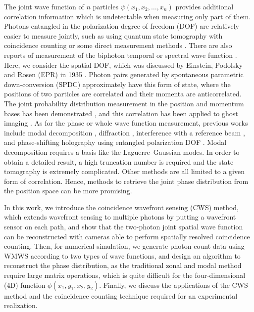 \documentclass[pra,english,reprint,nofootinbib,aps,superscriptaddress,showpacs,showkeys]{revtex4-2}
\theoremstyle{definition}
\theoremstyle{remark}
\begin{document}
	The joint wave function of $n$ particles $\psi(x_1,x_2,\ldots,x_n)$ provides additional correlation information which is undetectable when measuring only part of them. Photons entangled in the polarization degree of freedom (DOF) are relatively easier to measure jointly, such as using quantum state tomography with coincidence counting \cite{tomo,tomo2} or some direct measurement methods \cite{Pan2019,Chen2021}. There are also reports of measurement of the biphoton temporal or spectral wave function \cite{temp1,temp2}. Here, we consider the spatial DOF, which was discussed by Einstein, Podolsky and Rosen (EPR) in 1935 \cite{EPR}. Photon pairs generated by spontaneous parametric down-conversion (SPDC) \cite{corrreview} approximately have this form of state, where the positions of two particles are correlated and their momenta are anticorrelated. The joint probability distribution measurement in the position and momentum bases has been demonstrated \cite{Howell2004,Black2019}, and this correlation has been applied to ghost imaging \cite{ghostimag}. As for the phase or whole wave function measurement, previous works include modal decomposition \cite{Law2004,OAMtomo}, diffraction \cite{diffract}, interference with a reference beam \cite{refint}, and phase-shifting holography using entangled polarization DOF \cite{polarent}. Modal decomposition requires a basis like the Laguerre--Gaussian modes. In order to obtain a detailed result, a high truncation number is required and the state tomography is extremely complicated. Other methods are all limited to a given form of correlation. Hence, methods to retrieve the joint phase distribution from the position space can be more promising.
	
	In this work, we introduce the coincidence wavefront sensing (CWS) method, which extends wavefront sensing to multiple photons by putting a wavefront sensor on each path, and show that the two-photon joint spatial wave function can be reconstructed with cameras able to perform spatially resolved coincidence counting. Then, for numerical simulation, we generate photon count data using WMWS according to two types of wave functions, and design an algorithm to reconstruct the phase distribution, as the traditional zonal and modal method \cite{SHWSrecon} require large matrix operations, which is quite difficult for the four-dimensional (4D) function $\phi(x_1,y_1,x_2,y_2)$. Finally, we discuss the applications of the CWS method and the coincidence counting technique required for an experimental realization.
	
\end{document}
